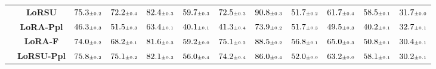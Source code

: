 \begin{table}
\begin{center}
\begin{small}
\begin{tabular}{l c c c c c c c c c c c}
& \textbf{LoRSU} & $75.3 \mtiny{\pm 0.2}$ & $72.2 \mtiny{\pm 0.4}$ & $82.4 \mtiny{\pm 0.3}$ & $59.7 \mtiny{\pm 0.3}$ & $72.5 \mtiny{\pm 0.3}$ & $90.8 \mtiny{\pm 0.3}$ & $51.7 \mtiny{\pm 0.2}$ & $61.7 \mtiny{\pm 0.4}$ & $58.5 \mtiny{\pm 0.1}$ & $31.7 \mtiny{\pm 0.0}$ \\
& \textbf{LoRA-Ppl} & $46.3 \mtiny{\pm 0.3}$ & $51.5 \mtiny{\pm 0.3}$ & $63.4 \mtiny{\pm 0.1}$ & $40.1 \mtiny{\pm 0.1}$ & $41.3 \mtiny{\pm 0.4}$ & $73.9 \mtiny{\pm 0.2}$ & $51.7 \mtiny{\pm 0.3}$ & $49.5 \mtiny{\pm 0.3}$ & $40.2 \mtiny{\pm 0.1}$ & $32.7 \mtiny{\pm 0.1}$ \\
& \textbf{LoRA-F} & $74.0 \mtiny{\pm 0.2}$ & $68.2 \mtiny{\pm 0.1}$ & $81.6 \mtiny{\pm 0.3}$ & $59.2 \mtiny{\pm 0.0}$ & $75.1 \mtiny{\pm 0.2}$ & $88.5 \mtiny{\pm 0.2}$ & $56.8 \mtiny{\pm 0.1}$ & $65.0 \mtiny{\pm 0.3}$ & $50.8 \mtiny{\pm 0.1}$ & $30.4 \mtiny{\pm 0.1}$ \\
& \textbf{LoRSU-Ppl} & $75.8 \mtiny{\pm 0.2}$ & $75.1 \mtiny{\pm 0.2}$ & $82.1 \mtiny{\pm 0.3}$ & $56.0 \mtiny{\pm 0.4}$ & $74.2 \mtiny{\pm 0.4}$ & $86.0 \mtiny{\pm 0.4}$ & $52.0 \mtiny{\pm 0.0}$ & $63.2 \mtiny{\pm 0.0}$ & $58.1 \mtiny{\pm 0.1}$ & $30.2 \mtiny{\pm 0.1}$ \\
\bottomrule
\end{tabular}
\endgroup
\end{small}
\end{center}
\vskip -0.1in
\end{table}


